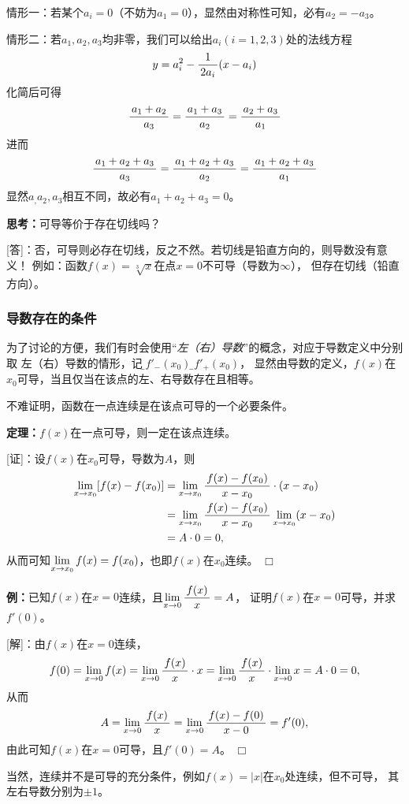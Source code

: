 情形一：若某个$a_i=0$（不妨为$a_1=0$），显然由对称性可知，必有$a_2=-a_3$。

情形二：若$a_1,a_2,a_3$均非零，我们可以给出$a_i(i=1,2,3)$处的法线方程
$$y=a_i^2-\displaystyle\frac{\,{1}\,}{\,{2a_i}\,}(x-a_i)$$
化简后可得
$$\displaystyle\frac{\,{a_1+a_2}\,}{\,{a_3}\,}=\displaystyle\frac{\,{a_1+a_3}\,}{\,{a_2}\,}=\displaystyle\frac{\,{a_2+a_3}\,}{\,{a_1}\,}$$
进而
$$\displaystyle\frac{\,{a_1+a_2+a_3}\,}{\,{a_3}\,}=\displaystyle\frac{\,{a_1+a_2+a_3}\,}{\,{a_2}\,}=\displaystyle\frac{\,{a_1+a_2+a_3}\,}{\,{a_1}\,}$$
显然$a_,a_2,a_3$相互不同，故必有$a_1+a_2+a_3=0$。

{\bf 思考：}可导等价于存在切线吗？

[答]：否，可导则必存在切线，反之不然。若切线是铅直方向的，则导数没有意义！
例如：函数$f(x)=\sqrt[3]x$在点$x=0$不可导（导数为$\infty$），
但存在切线（铅直方向）。

\subsubsection{导数存在的条件}

为了讨论的方便，我们有时会使用“{\it 左（右）导数}”的概念，对应于导数定义中分别取
左（右）导数的情形，记为{\b$f'_-(x_0)$}和{\b$f'_+(x_0)$}，
显然由导数的定义，$f(x)$在$x_0$可导，当且仅当在该点的左、右导数存在且相等。


% 

不难证明，函数在一点连续是在该点可导的一个必要条件。

\begin{thx}
	{\bf 定理：}$f(x)$在一点可导，则一定在该点连续。
\end{thx}

[证]：设$f(x)$在$x_0$可导，导数为$A$，则
\begin{align*}
	\lim\limits_{x\to{x_0}}[f(x)-f(x_0)]
	&=\lim\limits_{x\to{x_0}}\displaystyle\frac{\,{f(x)-f(x_0)}\,}{\,{x-x_0}\,}\cdot(x-x_0)\\
	&=\lim\limits_{x\to{x_0}}\displaystyle\frac{\,{f(x)-f(x_0)}\,}{\,{x-x_0}\,}\lim\limits_{x\to{x_0}}(x-x_0)\\
	&=A\cdot 0=0,
\end{align*}
从而可知$\lim\limits_{x\to{x_0}}f(x)=f(x_0)$，也即$f(x)$在$x_0$连续。
\hfill$\Box$

{\bf 例：}已知$f(x)$在$x=0$连续，且$\lim\limits_{x\to{0}}\displaystyle\frac{\,{f(x)}\,}{\,{x}\,}=A$，
证明$f(x)$在$x=0$可导，并求$f'(0)$。

[解]：由$f(x)$在$x=0$连续，
$$f(0)=\lim\limits_{x\to{0}}f(x)=\lim\limits_{x\to{0}}\displaystyle\frac{\,{f(x)}\,}{\,{x}\,}\cdot x
=\lim\limits_{x\to{0}}\displaystyle\frac{\,{f(x)}\,}{\,{x}\,}\cdot\lim\limits_{x\to{0}}x=A\cdot 0=0,$$
从而
$$A=\lim\limits_{x\to{0}}\displaystyle\frac{\,{f(x)}\,}{\,{x}\,}=\lim\limits_{x\to{0}}\displaystyle\frac{\,{f(x)-f(0)}\,}{\,{x-0}\,}=f'(0),$$
由此可知$f(x)$在$x=0$可导，且$f'(0)=A$。
\hfill$\Box$

当然，连续并不是可导的充分条件，例如$f(x)=|x|$在$x_0$处连续，但不可导，
其左右导数分别为$\pm 1$。


